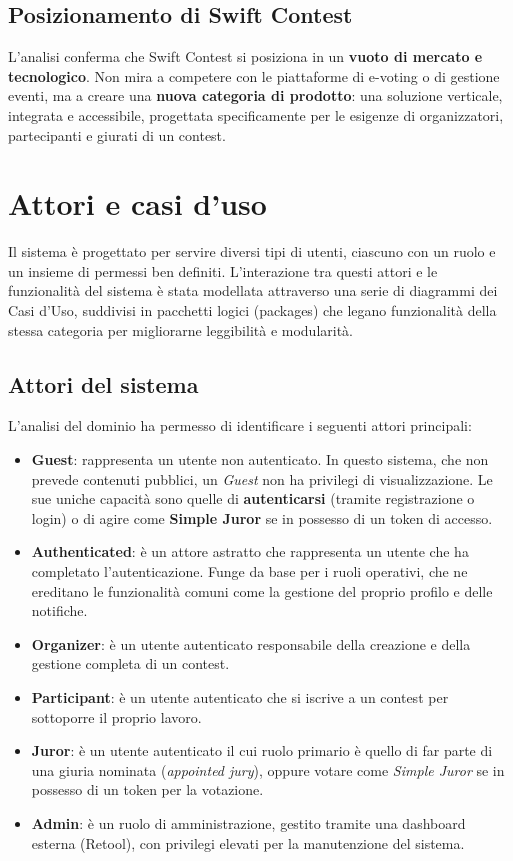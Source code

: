 \subsection{Posizionamento di Swift Contest}\label{subsec:posizionamento-di-swift-contest}
L'analisi conferma che Swift Contest si posiziona in un \textbf{vuoto di mercato e tecnologico}.
Non mira a competere con le piattaforme di e-voting o di gestione eventi, ma a creare una \textbf{nuova categoria di prodotto}: una soluzione verticale, integrata e accessibile, progettata specificamente per le esigenze di organizzatori, partecipanti e giurati di un contest.

\section{Attori e casi d’uso}\label{sec:attori-e-casi-duso}
Il sistema è progettato per servire diversi tipi di utenti, ciascuno con un ruolo e un insieme di permessi ben definiti.
L'interazione tra questi attori e le funzionalità del sistema è stata modellata attraverso una serie di diagrammi dei Casi d'Uso, suddivisi in pacchetti logici (packages) che legano funzionalità della stessa categoria per migliorarne leggibilità e modularità.

\subsection{Attori del sistema}\label{subsec:attori-del-sistema}
L'analisi del dominio ha permesso di identificare i seguenti attori principali:
\begin{itemize}
    \item \textbf{Guest}: rappresenta un utente non autenticato.
    In questo sistema, che non prevede contenuti pubblici, un \emph{Guest} non ha privilegi di visualizzazione.
    Le sue uniche capacità sono quelle di \textbf{autenticarsi} (tramite registrazione o login) o di agire come \textbf{Simple Juror} se in possesso di un token di accesso.
    \item \textbf{Authenticated}: è un attore astratto che rappresenta un utente che ha completato l'autenticazione.
    Funge da base per i ruoli operativi, che ne ereditano le funzionalità comuni come la gestione del proprio profilo e delle notifiche.
    \item \textbf{Organizer}: è un utente autenticato responsabile della creazione e della gestione completa di un contest.
    \item \textbf{Participant}: è un utente autenticato che si iscrive a un contest per sottoporre il proprio lavoro.
    \item \textbf{Juror}: è un utente autenticato il cui ruolo primario è quello di far parte di una giuria nominata (\emph{appointed jury}), oppure votare come \emph{Simple Juror} se in possesso di un token per la votazione.
    \item \textbf{Admin}: è un ruolo di amministrazione, gestito tramite una dashboard esterna (Retool), con privilegi elevati per la manutenzione del sistema.
\end{itemize}

